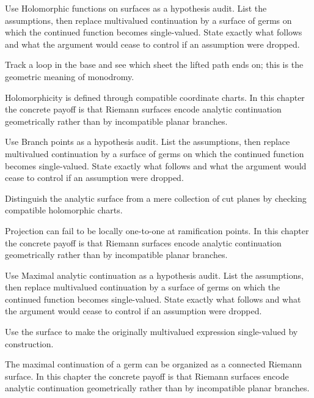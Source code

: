\begin{exercise}\label{exr:iv22-06}
Use Holomorphic functions on surfaces as a hypothesis audit. List the assumptions, then replace multivalued continuation by a surface of germs on which the continued function becomes single-valued. State exactly what follows and what the argument would cease to control if an assumption were dropped.
\end{exercise}
\begin{hint}
Track a loop in the base and see which sheet the lifted path ends on; this is the geometric meaning of monodromy.
\end{hint}
\begin{solution}
Holomorphicity is defined through compatible coordinate charts. In this chapter the concrete payoff is that Riemann surfaces encode analytic continuation geometrically rather than by incompatible planar branches.
\end{solution}

\begin{exercise}\label{exr:iv22-07}
Use Branch points as a hypothesis audit. List the assumptions, then replace multivalued continuation by a surface of germs on which the continued function becomes single-valued. State exactly what follows and what the argument would cease to control if an assumption were dropped.
\end{exercise}
\begin{hint}
Distinguish the analytic surface from a mere collection of cut planes by checking compatible holomorphic charts.
\end{hint}
\begin{solution}
Projection can fail to be locally one-to-one at ramification points. In this chapter the concrete payoff is that Riemann surfaces encode analytic continuation geometrically rather than by incompatible planar branches.
\end{solution}

\begin{exercise}\label{exr:iv22-08}
Use Maximal analytic continuation as a hypothesis audit. List the assumptions, then replace multivalued continuation by a surface of germs on which the continued function becomes single-valued. State exactly what follows and what the argument would cease to control if an assumption were dropped.
\end{exercise}
\begin{hint}
Use the surface to make the originally multivalued expression single-valued by construction.
\end{hint}
\begin{solution}
The maximal continuation of a germ can be organized as a connected Riemann surface. In this chapter the concrete payoff is that Riemann surfaces encode analytic continuation geometrically rather than by incompatible planar branches.
\end{solution}

